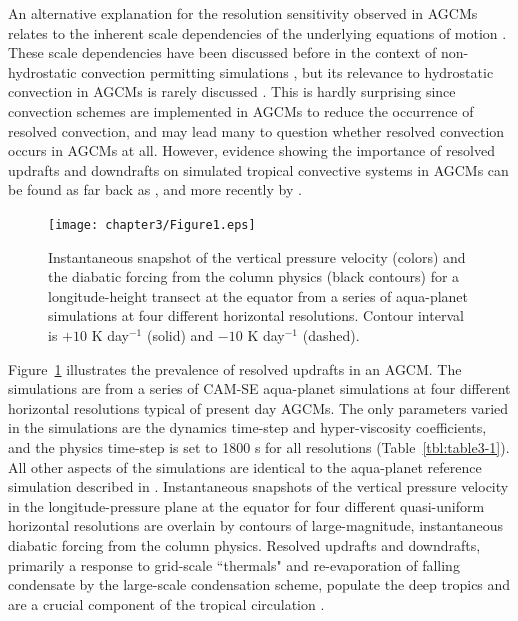 An alternative explanation for the resolution sensitivity observed in AGCMs relates to the inherent scale dependencies of the underlying equations of motion \citep{F2007JAS,HR2017JCLIM}. These scale dependencies have been discussed before in the context of non-hydrostatic convection permitting simulations \citep{O1981JAS,WETAL1997MWR,PG2006JAS,JR2016QJRMS}, but its relevance to hydrostatic convection in AGCMs is rarely discussed \citep{F2007JAS,J2017JAMES}. This is hardly surprising since convection schemes are implemented in AGCMs to reduce the occurrence of resolved convection, and may lead many to question whether resolved convection occurs in AGCMs at all. However, evidence showing the importance of resolved updrafts and downdrafts on simulated tropical convective systems in AGCMs can be found as far back as \cite{MK1997QJRMS}, and more recently by \cite{OETAL2016JAMES}.

\begin{figure}
\begin{center}
\noindent\texttt{[image: chapter3/Figure1.eps]}\\
\end{center}
\caption{Instantaneous snapshot of the vertical pressure velocity (colors) and the diabatic forcing from the column physics (black contours) for a longitude-height transect at the equator from a series of aqua-planet simulations at four different horizontal resolutions. Contour interval is $+10$ K day$^{-1}$ (solid) and $-10$ K day$^{-1}$ (dashed).}
\label{fig:figure3-1}
\end{figure}

Figure~\ref{fig:figure3-1} illustrates the prevalence of resolved updrafts in an AGCM. The simulations are from a series of CAM-SE aqua-planet simulations \citep[following][]{NH2000ASL} at four different horizontal resolutions typical of present day AGCMs. The only parameters varied in the simulations are the dynamics time-step and hyper-viscosity coefficients, and the physics time-step is set to 1800 s for all resolutions (Table~\ref{tbl:table3-1}). All other aspects of the simulations are identical to the aqua-planet reference simulation described in \cite{MWO2016JAMES}. Instantaneous snapshots of the vertical pressure velocity in the longitude-pressure plane at the equator for four different quasi-uniform horizontal resolutions are overlain by contours of large-magnitude, instantaneous diabatic forcing from the column physics. Resolved updrafts and downdrafts, primarily a response to grid-scale ``thermals" and re-evaporation of falling condensate by the large-scale condensation scheme, populate the deep tropics and are a crucial component of the tropical circulation \citep{HR2017JCLIM}. 

